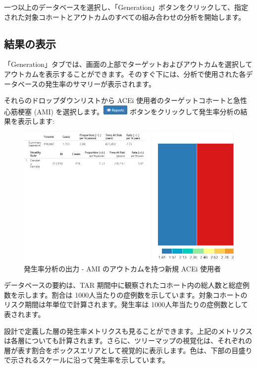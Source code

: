 \documentclass[
  11pt]{book}
\theoremstyle{definition}
\theoremstyle{definition}
\theoremstyle{definition}
\theoremstyle{definition}
\theoremstyle{remark}
\begin{document}
一つ以上のデータベースを選択し、「Generation」ボタンをクリックして、指定された対象コホートとアウトカムのすべての組み合わせの分析を開始します。

\subsection{結果の表示}\label{ux7d50ux679cux306eux8868ux793a-1}

「Generation」タブでは、画面の上部でターゲットおよびアウトカムを選択してアウトカムを表示することができます。そのすぐ下には、分析で使用された各データベースの発生率のサマリーが表示されます。

それらのドロップダウンリストから ACEi 使用者のターゲットコホートと急性心筋梗塞 (AMI) を選択します。\includegraphics{images/Characterization/atlasIncidenceReportButton.png} ボタンをクリックして発生率分析の結果を表示します:

\begin{figure}

{\centering \includegraphics[width=1\linewidth]{images/Characterization/atlasIncidenceResults} 

}

\caption{発生率分析の出力 - AMI のアウトカムを持つ新規 ACEi 使用者}\label{fig:atlasIncidenceResults}
\end{figure}

データベースの要約は、TAR 期間中に観察されたコホート内の総人数と総症例数を示します。割合は 1000人当たりの症例数を示しています。対象コホートのリスク期間は年単位で計算されます。発生率は 1000人年当たりの症例数として表されます。

設計で定義した層の発生率メトリクスも見ることができます。上記のメトリクスは各層についても計算されます。さらに、ツリーマップの視覚化は、それぞれの層が表す割合をボックスエリアとして視覚的に表示します。色は、下部の目盛りで示されるスケールに沿って発生率を示しています。
\end{document}
